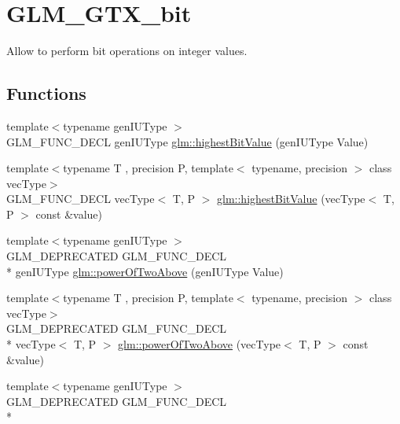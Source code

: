 \hypertarget{group__gtx__bit}{\section{G\-L\-M\-\_\-\-G\-T\-X\-\_\-bit}
\label{group__gtx__bit}
}


Allow to perform bit operations on integer values.  


\subsection*{Functions}
\begin{DoxyCompactItemize}
\item 
{\footnotesize template$<$typename gen\-I\-U\-Type $>$ }\\G\-L\-M\-\_\-\-F\-U\-N\-C\-\_\-\-D\-E\-C\-L gen\-I\-U\-Type \hyperlink{group__gtx__bit_ga0dcc8fe7c3d3ad60dea409281efa3d05}{glm\-::highest\-Bit\-Value} (gen\-I\-U\-Type Value)
\item 
{\footnotesize template$<$typename T , precision P, template$<$ typename, precision $>$ class vec\-Type$>$ }\\G\-L\-M\-\_\-\-F\-U\-N\-C\-\_\-\-D\-E\-C\-L vec\-Type$<$ T, P $>$ \hyperlink{group__gtx__bit_ga5eea3a4d429040af13d39a7d7cd84d73}{glm\-::highest\-Bit\-Value} (vec\-Type$<$ T, P $>$ const \&value)
\item 
{\footnotesize template$<$typename gen\-I\-U\-Type $>$ }\\G\-L\-M\-\_\-\-D\-E\-P\-R\-E\-C\-A\-T\-E\-D G\-L\-M\-\_\-\-F\-U\-N\-C\-\_\-\-D\-E\-C\-L \\*
gen\-I\-U\-Type \hyperlink{group__gtx__bit_ga8cda2459871f574a0aecbe702ac93291}{glm\-::power\-Of\-Two\-Above} (gen\-I\-U\-Type Value)
\item 
{\footnotesize template$<$typename T , precision P, template$<$ typename, precision $>$ class vec\-Type$>$ }\\G\-L\-M\-\_\-\-D\-E\-P\-R\-E\-C\-A\-T\-E\-D G\-L\-M\-\_\-\-F\-U\-N\-C\-\_\-\-D\-E\-C\-L \\*
vec\-Type$<$ T, P $>$ \hyperlink{group__gtx__bit_gafe08808a50226b75b50e640a08b32ddc}{glm\-::power\-Of\-Two\-Above} (vec\-Type$<$ T, P $>$ const \&value)
\item 
{\footnotesize template$<$typename gen\-I\-U\-Type $>$ }\\G\-L\-M\-\_\-\-D\-E\-P\-R\-E\-C\-A\-T\-E\-D G\-L\-M\-\_\-\-F\-U\-N\-C\-\_\-\-D\-E\-C\-L \\*

\end{DoxyCompactItemize}
